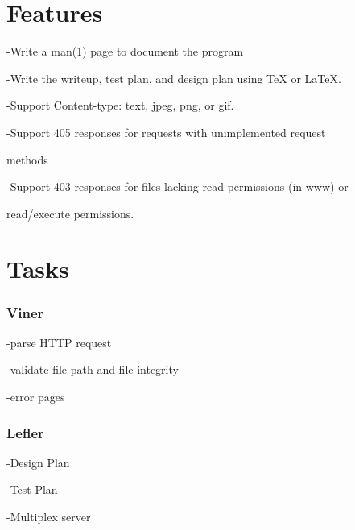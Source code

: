 \documentclass{article}
\begin{document}
\section*{\huge{Features}}
\hspace{1cm} -Write a man(1) page to document the program

\hspace{.5cm} -Write the writeup, test plan, and design plan using TeX or LaTeX.

\hspace{.5cm} -Support Content-type: text, jpeg, png, or gif.

\hspace{.5cm} -Support 405 responses for requests with unimplemented request 

\hspace{.7cm} methods 


\hspace{.5cm} -Support 403 responses for files lacking read permissions (in www) or

\hspace{.7cm}read/execute permissions.



\section*{\huge{\textbf{Tasks}}}

\subsubsection*{Viner}
\hspace{1cm} -parse HTTP request

\hspace{.5cm} -validate file path and file integrity

\hspace{.5cm} -error pages

\subsubsection*{Lefler}

\hspace{1cm} -Design Plan

\hspace{.5cm} -Test Plan

\hspace{.5cm} -Multiplex server
\end{document}

